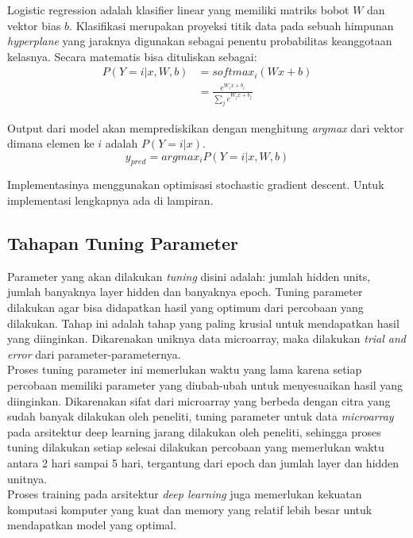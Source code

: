 Logistic regression adalah klasifier linear yang memiliki matriks bobot $W$ dan vektor bias $b$. Klasifikasi merupakan proyeksi titik data pada sebuah himpunan \textit{hyperplane} yang jaraknya digunakan sebagai penentu probabilitas keanggotaan kelasnya. Secara matematis bisa dituliskan sebagai:
\begin{equation}
\begin{aligned}
  P(Y=i|x, W,b) &= softmax_i(W x + b) \\
                &= \frac {e^{W_i x + b_i}} {\sum_j e^{W_j x + b_j}}
\end{aligned}
\end{equation}

Output dari model akan memprediskikan dengan menghitung \textit{argmax} dari vektor dimana elemen ke $i$ adalah $P(Y=i|x)$.
\begin{equation}
  y_{pred} = argmax_i  P(Y=i|x,W,b)
\end{equation}

Implementasinya menggunakan optimisasi stochastic gradient descent. Untuk implementasi lengkapnya ada di lampiran.

\subsection{Tahapan Tuning Parameter}
Parameter yang akan dilakukan \textit{tuning} disini adalah: jumlah hidden units, jumlah banyaknya layer hidden dan banyaknya epoch. Tuning parameter dilakukan agar bisa didapatkan hasil yang optimum dari percobaan yang dilakukan. Tahap ini adalah tahap yang paling krusial untuk mendapatkan hasil yang diinginkan. Dikarenakan uniknya data microarray, maka  dilakukan \textit{trial and error} dari parameter-parameternya.\\
Proses tuning parameter ini memerlukan waktu yang lama karena setiap percobaan memiliki parameter yang diubah-ubah untuk menyesuaikan hasil yang diinginkan. Dikarenakan sifat dari microarray yang berbeda dengan citra yang sudah banyak dilakukan oleh peneliti, tuning parameter untuk data \textit{microarray} pada arsitektur deep learning jarang dilakukan oleh peneliti, sehingga proses tuning dilakukan setiap selesai dilakukan percobaan yang memerlukan waktu antara 2 hari sampai 5 hari, tergantung dari epoch dan jumlah layer dan hidden unitnya.\\
Proses training pada arsitektur \textit{deep learning} juga memerlukan kekuatan komputasi komputer yang kuat dan memory yang relatif lebih besar untuk mendapatkan model yang optimal. 



